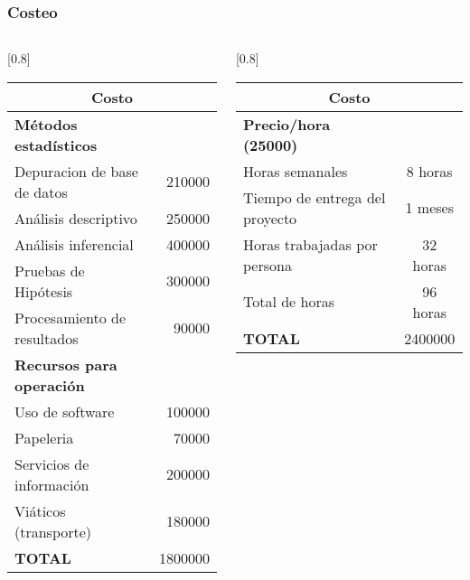 \documentclass[12pt]{beamer}
\begin{document}
\begin{frame}
\frametitle{Costeo}
\begin{columns}[T] %
\begin{column}{.48\textwidth}
\begin{table}[htbp]
\scalebox{0.8}[0.8]{
    \begin{tabular}{|lr|}
    \hline
    \multicolumn{2}{|c|}{\textbf{Costo}} \\
    \hline
    \textbf{Métodos estadísticos} &  \\
    Depuracion de base de datos & 210000 \\
    Análisis descriptivo & 250000 \\
    Análisis inferencial & 400000 \\
    Pruebas de Hipótesis & 300000 \\
    Procesamiento de resultados & 90000 \\
    \textbf{Recursos para operación} &  \\
    Uso de software & 100000 \\
    Papeleria & 70000 \\
    Servicios de información & 200000 \\
    Viáticos (transporte) & 180000 \\
    \textbf{TOTAL} & 1800000 \\
    \hline
    \end{tabular}%
    }
  \label{tab:addlabel}%
\end{table}%
\end{column}%
\hfill%
\begin{column}{.48\textwidth}
\begin{table}[htbp]
\scalebox{0.7}[0.8]{
    \begin{tabular}{|lc|}
    \hline
    \multicolumn{2}{|c|}{\textbf{Costo}} \\
    \hline
    \textbf{Precio/hora (25000)} &  \\
    Horas semanales & 8 horas \\
    Tiempo de entrega del proyecto & 1 meses \\
    Horas  trabajadas por persona & 32 horas \\
    Total de horas  & 96 horas \\
    \textbf{TOTAL} & 2400000 \\
    \hline
    \end{tabular}%
    }
  \label{tab:addlabel}%
\end{table}%

\end{column}%
\end{columns}


\end{frame}
\end{document}

